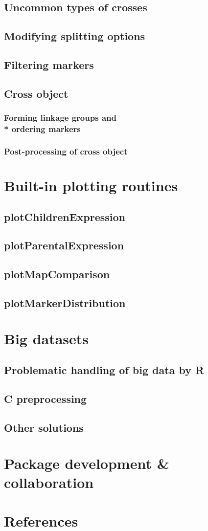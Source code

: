 \documentclass{article}
\begin{document}
\subsection{Uncommon types of crosses}
\blindtext
\subsection{Modifying splitting options}
\blindtext
\subsection{Filtering markers}
\blindtext
\subsection{Cross object}
\blindtext
\subsubsection{Forming linkage groups and \\* ordering markers}
\blindtext
\subsubsection{Post-processing of cross object}
\blindtext

\newpage
\section{Built-in plotting routines}
\subsection{plotChildrenExpression}
\blindtext[2]
\subsection{plotParentalExpression}
\blindtext[2]
\subsection{plotMapComparison}
\blindtext[2]
\subsection{plotMarkerDistribution}
\blindtext[2]
\newpage
\section{Big datasets}

\subsection{Problematic handling of big data by R}
\blindtext
\subsection{C preprocessing}
\blindtext
\subsection{Other solutions}
\blindtext

\newpage
\section{Package development \& collaboration}
\newpage
\section{References}
\end{document}
